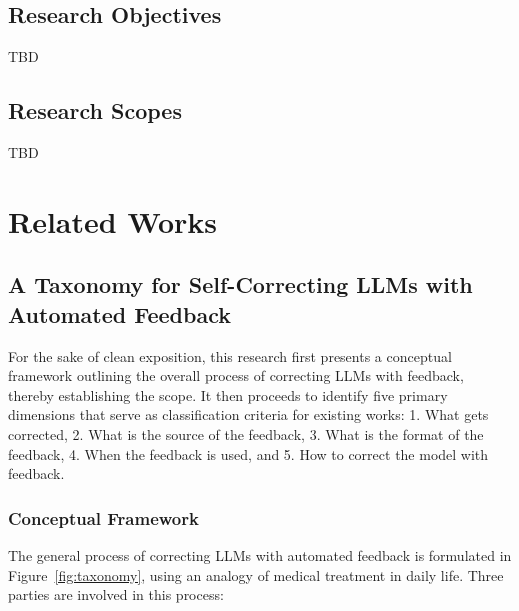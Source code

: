 \documentclass[a4paper,oneside]{book}
\begin{document}
\section{Research Objectives}
TBD

\section{Research Scopes}
TBD

\chapter{Related Works}

\section{A Taxonomy for Self-Correcting LLMs with Automated Feedback}
For the sake of clean exposition, this research first presents a conceptual framework outlining the overall process of correcting LLMs with feedback, thereby establishing the scope. It then proceeds to identify five primary dimensions that serve as classification criteria for existing works: 1. What gets corrected, 2. What is the source of the feedback, 3. What is the format of the feedback, 4. When the feedback is used, and 5. How to correct the model with feedback.

\subsection{Conceptual Framework}
The general process of correcting LLMs with automated feedback is formulated in Figure~\ref{fig:taxonomy}, using an analogy of medical treatment in daily life. Three parties are involved in this process:
\end{document}
